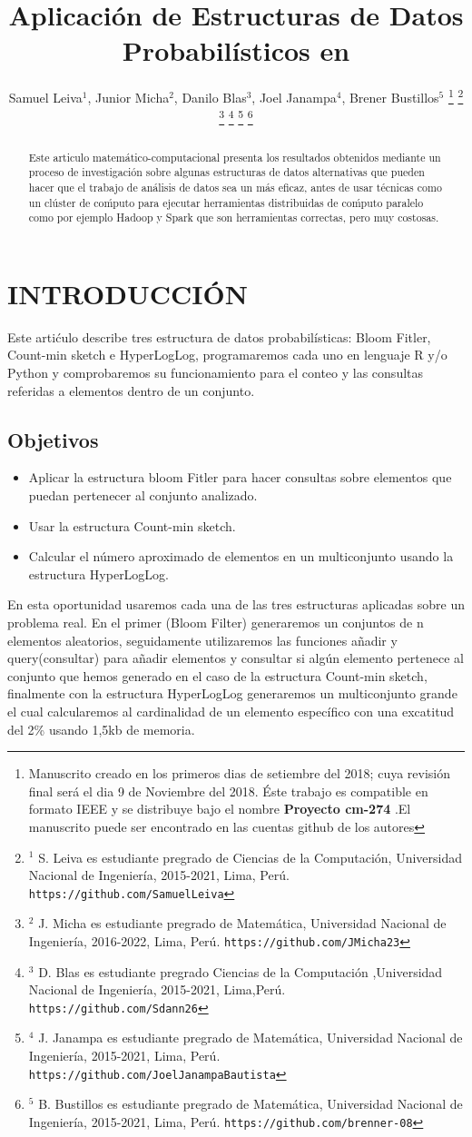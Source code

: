 \documentclass[journal]{IEEEtran}
\title{\LARGE \bf Aplicaci\'on de Estructuras de Datos Probabil\'isticos en
}
\author{Samuel Leiva$^{1}$, Junior Micha$^{2}$, Danilo Blas$^{3}$, Joel Janampa$^{4}$, Brener Bustillos$^{5}$%
\thanks{Manuscrito creado en los primeros dias de setiembre del 2018; cuya revisi\'on final ser\'a el dia 9 de Noviembre del 2018. \'Este trabajo es compatible en formato IEEE y se distribuye bajo el nombre \textbf{Proyecto cm-274} .El manuscrito puede ser encontrado en las cuentas github de los autores}%
\thanks{$^{1}$ S. Leiva es estudiante pregrado de Ciencias de la Computaci\'on, Universidad Nacional de Ingenier\'ia, 2015-2021, Lima, Per\'u.
        {\tt\small https://github.com/SamuelLeiva}}%
\thanks{$^{2}$ J. Micha es estudiante pregrado de Matem\'atica, Universidad Nacional de Ingenier\'ia, 2016-2022, Lima, Per\'u.
        {\tt\small https://github.com/JMicha23}}%
\thanks{$^{3}$ D. Blas es estudiante pregrado Ciencias de la Computaci\'on ,Universidad Nacional de Ingenier\'ia, 2015-2021, Lima,Per\'u.
        {\tt\small https://github.com/Sdann26}}%
\thanks{$^{4}$ J. Janampa es estudiante pregrado de Matem\'atica, Universidad Nacional de Ingenier\'ia, 2015-2021, Lima, Per\'u.
        {\tt\small https://github.com/JoelJanampaBautista}}%
\thanks{$^{5}$ B. Bustillos es estudiante pregrado de Matem\'atica, Universidad Nacional de Ingenier\'ia, 2015-2021, Lima, Per\'u. 
        {\tt\small https://github.com/brenner-08}}%
}
\begin{document}
\maketitle
\thispagestyle{empty}
\pagestyle{empty}


\begin{abstract}
    

Este articulo matem\'atico-computacional presenta los resultados obtenidos mediante un proceso de investigaci\'on sobre algunas estructuras de datos alternativas que pueden hacer que el trabajo de an\'alisis de datos sea un m\'as eficaz, antes de usar t\'ecnicas como un cl\'uster de co\'mputo para ejecutar herramientas distribuidas de co\'mputo paralelo como por ejemplo  Hadoop y Spark que son herramientas correctas, pero muy costosas.

\end{abstract}


\section{INTRODUCCI\'ON}

Este arti\'culo describe tres estructura de datos probabilísticas: Bloom Fitler, Count-min sketch e HyperLogLog, programaremos cada uno en lenguaje R y/o Python y comprobaremos su funcionamiento para el conteo y las consultas referidas a elementos dentro de un conjunto.

\subsection{Objetivos}
\begin{itemize}
    \item Aplicar la estructura bloom Fitler para hacer consultas sobre elementos que puedan pertenecer al conjunto analizado. 
    \item Usar la estructura Count-min sketch.
    \item Calcular el número aproximado de elementos en un multiconjunto usando la estructura HyperLogLog. 
\end{itemize}

En esta oportunidad usaremos cada una de las tres estructuras aplicadas sobre un problema real. En el primer (Bloom Filter) generaremos un conjuntos de n elementos aleatorios, seguidamente utilizaremos las funciones añadir y query(consultar) para añadir elementos y consultar si algún elemento pertenece al conjunto que hemos generado en el caso de la estructura Count-min sketch, finalmente con la estructura HyperLogLog generaremos un multiconjunto grande el cual calcularemos al cardinalidad de un elemento específico con una excatitud del 2\% usando 1,5kb de memoria.
\end{document}
